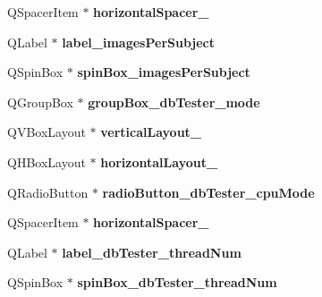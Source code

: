 \begin{DoxyCompactItemize}
\mbox{\label{class_ui___main_window_a3817963f3405366f96b5778db81eaa78}} 
Q\+Spacer\+Item $\ast$ {\bfseries horizontal\+Spacer\+\_}
\item 
\mbox{\label{class_ui___main_window_a238c13b974ac25767cb9017e28806d96}} 
Q\+Label $\ast$ {\bfseries label\+\_\+images\+Per\+Subject}
\item 
\mbox{\label{class_ui___main_window_a31737da654440d92ae610abeb1a69627}} 
Q\+Spin\+Box $\ast$ {\bfseries spin\+Box\+\_\+images\+Per\+Subject}
\item 
\mbox{\label{class_ui___main_window_a7ec41648e1662c573b43321912b03945}} 
Q\+Group\+Box $\ast$ {\bfseries group\+Box\+\_\+db\+Tester\+\_\+mode}
\item 
\mbox{\label{class_ui___main_window_a3d04e4752808d4545c12e07a83a5d76c}} 
Q\+V\+Box\+Layout $\ast$ {\bfseries vertical\+Layout\+\_}
\item 
\mbox{\label{class_ui___main_window_a2e3b2c968196f34ff4b03bfce9197f51}} 
Q\+H\+Box\+Layout $\ast$ {\bfseries horizontal\+Layout\+\_}
\item 
\mbox{\label{class_ui___main_window_a1bef12ce4c6bca0511eadc9da787cec1}} 
Q\+Radio\+Button $\ast$ {\bfseries radio\+Button\+\_\+db\+Tester\+\_\+cpu\+Mode}
\item 
\mbox{\label{class_ui___main_window_a92d6e301f65fad9005d1e0aef6e99e92}} 
Q\+Spacer\+Item $\ast$ {\bfseries horizontal\+Spacer\+\_}
\item 
\mbox{\label{class_ui___main_window_a4187dfca1fbd928b78880afa90ea456e}} 
Q\+Label $\ast$ {\bfseries label\+\_\+db\+Tester\+\_\+thread\+Num}
\item 
\mbox{\label{class_ui___main_window_a0891bfe63ae9f544cc1c0784e927efea}} 
Q\+Spin\+Box $\ast$ {\bfseries spin\+Box\+\_\+db\+Tester\+\_\+thread\+Num}
\item 
\mbox{\label{class_ui___main_window_ad71dba17e1b42668ae5253f92fbab557}} 

\end{DoxyCompactItemize}
